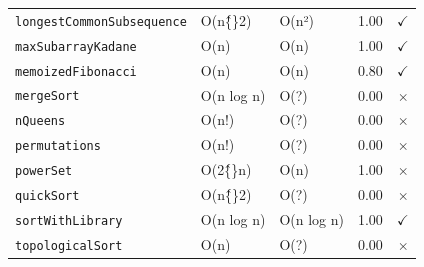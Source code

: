\begin{table}[h]
\begin{tabular}{lllrr}
    \texttt{longestCommonSubsequence} & O(n\^\{\}2) & O(n²) & 1.00 & $\checkmark$ \\
    \texttt{maxSubarrayKadane} & O(n) & O(n) & 1.00 & $\checkmark$ \\
    \texttt{memoizedFibonacci} & O(n) & O(n) & 0.80 & $\checkmark$ \\
    \texttt{mergeSort} & O(n log n) & O(?) & 0.00 & $\times$ \\
    \texttt{nQueens} & O(n!) & O(?) & 0.00 & $\times$ \\
    \texttt{permutations} & O(n!) & O(?) & 0.00 & $\times$ \\
    \texttt{powerSet} & O(2\^\{\}n) & O(n) & 1.00 & $\times$ \\
    \texttt{quickSort} & O(n\^\{\}2) & O(?) & 0.00 & $\times$ \\
    \texttt{sortWithLibrary} & O(n log n) & O(n log n) & 1.00 & $\checkmark$ \\
    \texttt{topologicalSort} & O(n) & O(?) & 0.00 & $\times$ \\
    \bottomrule
  \end{tabular}
\end{table}

